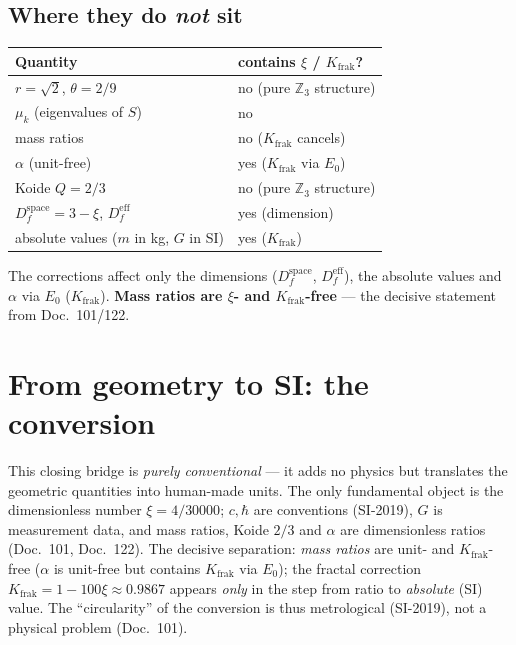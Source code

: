 \subsection{Where they do \emph{not} sit}
\begin{center}
\begin{tabular}{@{}p{5.2cm} p{6cm}@{}}
\toprule
Quantity & contains $\xi$ / $K_{\text{frak}}$? \\
\midrule
$r=\sqrt2$, $\theta=2/9$ & no (pure $\mathbb{Z}_3$ structure) \\
$\mu_k$ (eigenvalues of $S$) & no \\
mass ratios & no ($K_{\text{frak}}$ cancels) \\
$\alpha$ (unit-free) & yes ($K_{\text{frak}}$ via $E_0$) \\
Koide $Q=2/3$ & no (pure $\mathbb{Z}_3$ structure) \\
$D_f^{\text{space}}=3-\xi$, $D_f^{\text{eff}}$ & yes (dimension) \\
absolute values ($m$ in kg, $G$ in SI) & yes ($K_{\text{frak}}$) \\
\bottomrule
\end{tabular}
\end{center}
The corrections affect only the dimensions ($D_f^{\text{space}}$, $D_f^{\text{eff}}$), the absolute
values and $\alpha$ via $E_0$ ($K_{\text{frak}}$). \textbf{Mass ratios are $\xi$- and $K_{\text{frak}}$-free} --- the decisive
statement from Doc.~101/122.

\section{From geometry to SI: the conversion}
This closing bridge is \emph{purely conventional} --- it adds no physics but translates the geometric
quantities into human-made units. The only fundamental object is the dimensionless number
$\xi=4/30000$; $c,\hbar$ are conventions (SI-2019), $G$ is measurement data, and mass ratios, Koide
$2/3$ and $\alpha$ are dimensionless ratios (Doc.~101, Doc.~122). The decisive separation:
\emph{mass ratios} are unit- and $K_{\text{frak}}$-free ($\alpha$ is unit-free but contains $K_{\text{frak}}$ via $E_0$); the fractal correction
$K_{\text{frak}}=1-100\xi\approx 0.9867$ appears \emph{only} in the step from ratio to
\emph{absolute} (SI) value. The \enquote{circularity} of the conversion is thus metrological
(SI-2019), not a physical problem (Doc.~101).

